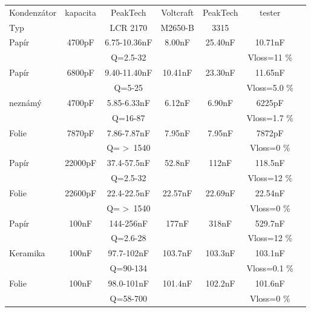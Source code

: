 \begin{tabular}{| l | c | c | c | c | c | c |}
   \hline
Kondenzátor & kapacita      & PeakTech     & Voltcraft & PeakTech & tester \\
Typ        &   & LCR 2170     & M2650-B   &  3315    &       \\
    \hline
    \hline
Papír     & 4700pF      & 6.75-10.36nF & 8.00nF    &  25.40nF &  10.71nF   \\
           &             &  Q=2.5-32    &           &          &  Vloss=11 \% \\
    \hline
Papír     & 6800pF      & 9.40-11.40nF & 10.41nF   &  23.30nF &  11.65nF  \\
           &             &  Q=5-25      &           &          &  Vloss=5.0 \% \\
    \hline
neznámý  & 4700pF      & 5.85-6.33nF  & 6.12nF    &  6.90nF  &  6225pF  \\
           &             &  Q=16-87     &           &          &  Vloss=1.7 \% \\
    \hline
Folie      & 7870pF      & 7.86-7.87nF  & 7.95nF    &  7.95nF  &  7872pF  \\
           &             &  Q= \textgreater~1540    &           &          &  Vloss=0 \% \\
    \hline
Papír     & 22000pF     & 37.4-57.5nF  & 52.8nF    &  112nF   &  118.5nF \\
           &             &  Q=2.5-32    &           &          &  Vloss=12 \% \\
    \hline
Folie      & 22600pF     & 22.4-22.5nF  & 22.57nF   & 22.69nF  &  22.54nF \\
           &             & Q= \textgreater~1540     &           &          &  Vloss=0 \% \\
    \hline
Papír     & 100nF       & 144-256nF    & 177nF     &  318nF   &  529.7nF \\
           &             & Q=2.6-28     &           &          &  Vloss=12 \% \\
    \hline
Keramika  & 100nF       & 97.7-102nF   & 103.7nF   & 103.3nF  &  103.1nF \\
           &             & Q=90-134     &           &          &  Vloss=0.1 \% \\
    \hline
Folie      & 100nF       & 98.0-101nF   & 101.4nF   & 102.2nF  &  101.6nF \\
           &             & Q=58-700     &           &          &  Vloss=0 \% \\
    \hline
\end{tabular}

